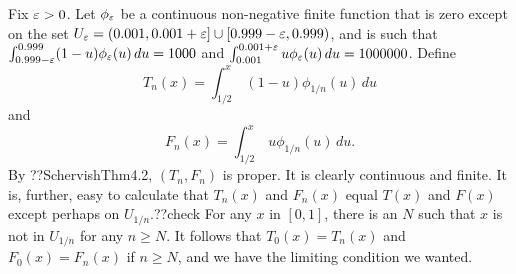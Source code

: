 Fix $\varepsilon>0$. Let $\phi_\varepsilon$ be a continuous non-negative finite function that is zero except on the set $U_\varepsilon=(0.001,0.001+\varepsilon]\cup [0.999-\varepsilon,0.999)$, 
and is such that $\int_{0.999-\varepsilon}^{0.999} (1-u) \phi_\varepsilon(u)\, du = 1000$ and $\int_{0.001}^{0.001+\varepsilon} u \phi_\varepsilon(u) \, du = 1000000$. 
Define 
$$
    T_n(x) = \int_{1/2}^x \, (1-u)\phi_{1/n}(u) \, du
$$
and 
$$
    F_n(x) = \int_{1/2}^x \, u \phi_{1/n}(u) \, du.
$$
By ??SchervishThm4.2, $(T_n,F_n)$ is proper. It is clearly continuous and finite. It is, further, easy to calculate that 
$T_n(x)$ and $F_n(x)$ equal $T(x)$ and $F(x)$ except perhaps on $U_{1/n}$.??check For any $x$ in $[0,1]$, there is an $N$
such that $x$ is not in $U_{1/n}$ for any $n\ge N$. It follows that $T_0(x)=T_n(x)$ and $F_0(x)=F_n(x)$ if $n\ge N$, and we have
the limiting condition we wanted.

\chaptertail 


